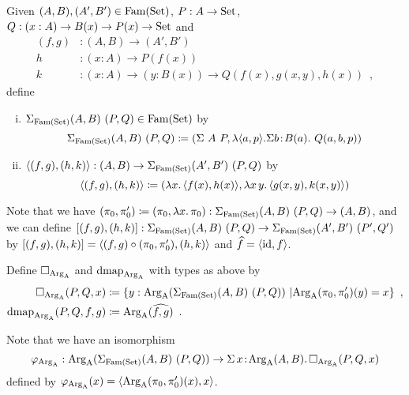 \documentclass[orivec,envcountsame, ,envcountsect]{llncs}
\begin{document}
\begin{definition}
  Given $(A, B), (A', B') \in \text{Fam}(\text{Set})$, $P : A \to \text{Set}$, $Q : (x : A)
  \to B(x) \to P(x) \to \text{Set}$ and 
  \begin{align*}
(f, g) &: (A, B) \to (A', B') \\
h &: (x : A) \to P(f(x)) \\
k &: (x : A) \to (y : B(x)) \to Q(f(x), g(x, y), h(x)) \enspace ,
  \end{align*}
 define
  \begin{enumerate}[(i)]
  \item $\Sigma_{\text{Fam}(\text{Set})} (A, B)\ (P, Q) \in \text{Fam}(\text{Set})$ by
 \[
\Sigma_{\text{Fam}(\text{Set})} (A, B)\ (P, Q) \coloneqq (\Sigma\ A\ P, \lambda
    \langle a, p\rangle . \Sigma b\!:\!B(a).\ Q(a, b, p))
 \]
  \item $\langle(f, g), (h, k)\rangle : (A, B) \to \Sigma_{\text{Fam}(\text{Set})} (A', B')\ (P, Q)$ by
\[
\langle(f, g), (h, k)\rangle \coloneqq (\lambda x .\, \langle f(x), h(x)\rangle, \lambda x\,y .\, \langle g(x, y), k(x, y)\rangle)
\]
  \end{enumerate}
\end{definition}
  Note that we have $(\pi_0, \pi'_0) \coloneqq (\pi_0, \lambda x .\,
  \pi_0) : \Sigma_{\text{Fam}(\text{Set})} (A, B)\ (P, Q) \to (A, B)$, and we can define
$[(f, g), (h, k)] : \Sigma_{\text{Fam}(\text{Set})} (A, B)\ (P, Q) \to \Sigma_{\text{Fam}(\text{Set})} (A', B')\ (P', Q')$
by $[(f, g), (h, k)] = \langle(f, g) \circ (\pi_0, \pi'_0), (h, k)\rangle$
 and $\widehat{f} = \langle\text{id}, f\rangle$. %

  
\begin{definition}
Define $\Box_{\text{Arg}_{\text{A}}}$ and $\text{dmap}_{\text{Arg}_{\text{A}}}$ with types as above by
\begin{align*}
\BOX_{\ArgA}(P, Q, x) &\coloneqq %
    \{ y : \ArgA(\SigmaFAM (A, B)\ (P, Q))\ | \ArgA(\pi_0, \pi'_0)(y) = x\} \enspace , \\
\dmap_{\ArgA}(P, Q, f, g) &\coloneqq %
    \ArgA(\CwFsect{f, g}) \enspace .
\end{align*}
\end{definition}


\noindent Note that we have an isomorphism
\[
\varphi_{\text{Arg}_{\text{A}}} : \text{Arg}_{\text{A}}(\Sigma_{\text{Fam}(\text{Set})} (A, B)\ (P, Q)) \to \Sigma\,x\!:\! \text{Arg}_{\text{A}}(A, B) .\, \Box_{\text{Arg}_{\text{A}}}(P, Q, x)
\]
defined by $\varphi_{\text{Arg}_{\text{A}}}(x) = \langle \text{Arg}_{\text{A}}(\pi_0, \pi'_0)(x), x\rangle$.
\end{document}
